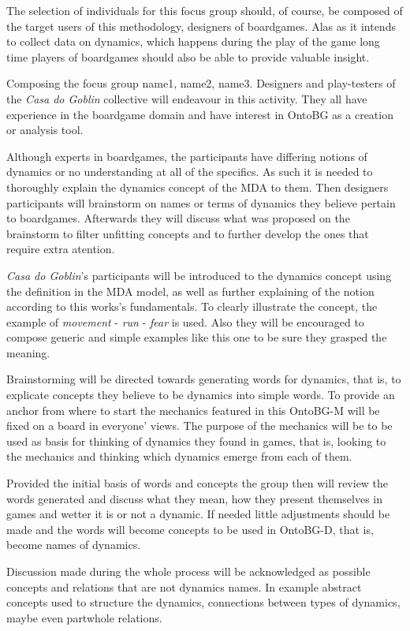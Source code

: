 The selection of individuals for this focus group should, of course, be composed of the target users of this methodology, designers of boardgames. Alas as it intends to collect data on dynamics, which happens during the play of the game long time players of boardgames should also be able to provide valuable insight. 

Composing the focus group name1, name2, name3. Designers and play-testers of the \textit{Casa do Goblin} collective will endeavour in this activity. They all have experience in the boardgame domain and have interest in OntoBG as a creation or analysis tool.

Although experts in boardgames, the participants have differing notions of dynamics or no understanding at all of the specifics. As such it is needed to thoroughly explain the dynamics concept of the MDA to them. Then designers participants will brainstorm on names or terms of dynamics they believe pertain to boardgames. Afterwards they will discuss what was proposed on the brainstorm to filter unfitting concepts and to further develop the ones that require extra atention.

\textit{Casa do Goblin}'s participants will be introduced to the dynamics concept using the definition in the MDA model, as well as further explaining of the notion according to this works's fundamentals. To clearly illustrate the concept, the example of \textit{movement} - \textit{run} - \textit{fear}  is used. Also they will be encouraged to compose generic and simple examples like this one to be sure they grasped the meaning. 

Brainstorming will be directed towards generating words for dynamics, that is, to explicate concepts they believe to be dynamics into simple words. To provide an anchor from where to start the mechanics featured in this OntoBG-M will be fixed on a board in everyone' views. The purpose of the mechanics will be to be used as basis for thinking of dynamics they found in games, that is, looking to the mechanics and thinking which dynamics emerge from each of them.

Provided the initial basis of words and concepts the group then will review the words generated and discuss what they mean, how they present themselves in games and wetter it is or not a dynamic. If needed little adjustments should be made and the words will become concepts to be used in OntoBG-D, that is, become names of dynamics.

Discussion made during the whole process will be acknowledged as possible concepts and relations that are not dynamics names. In example abstract concepts used to structure the dynamics, connections between types of dynamics, maybe even partwhole relations.



